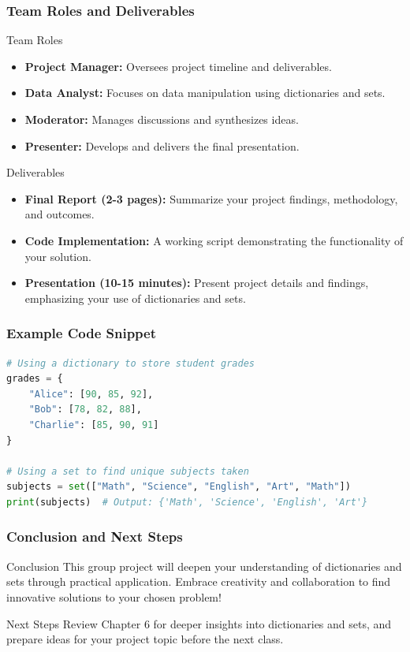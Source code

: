 \documentclass{beamer}
\begin{document}
\begin{frame}
    \frametitle{Team Roles and Deliverables}
    \begin{block}{Team Roles}
        \begin{itemize}
            \item \textbf{Project Manager:} Oversees project timeline and deliverables.
            \item \textbf{Data Analyst:} Focuses on data manipulation using dictionaries and sets.
            \item \textbf{Moderator:} Manages discussions and synthesizes ideas.
            \item \textbf{Presenter:} Develops and delivers the final presentation.
        \end{itemize}
    \end{block}

    \begin{block}{Deliverables}
        \begin{itemize}
            \item \textbf{Final Report (2-3 pages):} Summarize your project findings, methodology, and outcomes.
            \item \textbf{Code Implementation:} A working script demonstrating the functionality of your solution.
            \item \textbf{Presentation (10-15 minutes):} Present project details and findings, emphasizing your use of dictionaries and sets.
        \end{itemize}
    \end{block}
\end{frame}

\begin{frame}[fragile]
    \frametitle{Example Code Snippet}
    \begin{lstlisting}[language=Python]
# Using a dictionary to store student grades
grades = {
    "Alice": [90, 85, 92],
    "Bob": [78, 82, 88],
    "Charlie": [85, 90, 91]
}

# Using a set to find unique subjects taken
subjects = set(["Math", "Science", "English", "Art", "Math"])
print(subjects)  # Output: {'Math', 'Science', 'English', 'Art'}
    \end{lstlisting}
\end{frame}

\begin{frame}
    \frametitle{Conclusion and Next Steps}
    \begin{block}{Conclusion}
        This group project will deepen your understanding of dictionaries and sets through practical application. Embrace creativity and collaboration to find innovative solutions to your chosen problem!
    \end{block}

    \begin{block}{Next Steps}
        Review Chapter 6 for deeper insights into dictionaries and sets, and prepare ideas for your project topic before the next class.
    \end{block}
\end{frame}
\end{document}
